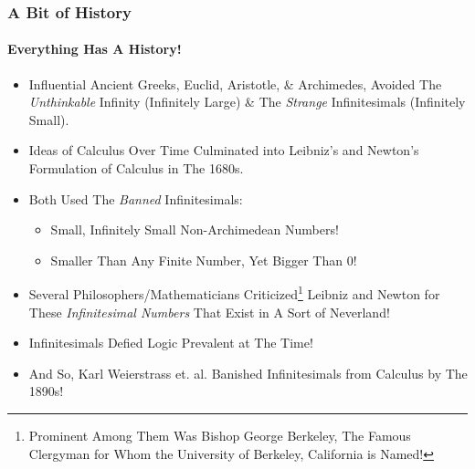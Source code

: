 \begin{frame}
\frametitle{A Bit of History}
\framesubtitle{Everything Has A History!}
\label{slide:history-of-nonstandard-analysis}
\begin{itemize}
\item Influential Ancient Greeks, Euclid, Aristotle, \& Archimedes, \alert{Avoided The \textit{Unthinkable} Infinity (Infinitely Large) \& The \textit{Strange} Infinitesimals (Infinitely Small)}. 
\pause
\item Ideas of Calculus Over Time Culminated into \alert{Leibniz's and Newton's Formulation of Calculus} in The 1680s.
\pause
\item Both Used The \alert{\textit{Banned} Infinitesimals}:
\begin{itemize}
\pause
\item Small, \alert{Infinitely Small} Non-Archimedean Numbers!
\pause
\item Smaller Than Any Finite Number, Yet Bigger Than 0!
\end{itemize}
\pause
\item Several Philosophers/Mathematicians Criticized\footnote{Prominent Among Them Was Bishop George Berkeley, The Famous Clergyman for Whom the University of Berkeley, California is Named!} Leibniz and Newton for These \textit{Infinitesimal Numbers} \alert{That Exist in A Sort of Neverland}!
\pause
\item Infinitesimals Defied \alert{Logic Prevalent at The Time}!
\pause
\item And So, Karl Weierstrass et. al. \alert{Banished Infinitesimals from Calculus by The 1890s}!
\end{itemize}
\end{frame}
